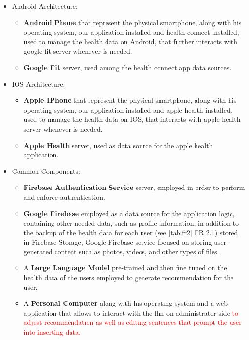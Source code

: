 \begin{itemize}[nosep] %
    \item Android Architecture:\vspace{2ex}
          \begin{itemize}[nosep]
              \item \textbf{Android Phone} that represent the physical smartphone, along with his operating system, our application installed and health connect installed, used to manage the health data on Android, that further interacts with google fit server whenever is needed.
              \item \textbf{Google Fit} server, used among the health connect app data sources.
          \end{itemize}
          \vspace{3ex}
    \item IOS Architecture:\vspace{2ex}
          \begin{itemize}[nosep]
              \item \textbf{Apple IPhone} that represent the physical smartphone, along with his operating system, our application installed and apple health installed, used to manage the health data on IOS, that interacts with apple health server whenever is needed.
              \item \textbf{Apple Health} server, used as data source for the apple health application.
          \end{itemize}
          \vspace{10ex}
    \item Common Components:\vspace{2ex}
          \begin{itemize}[nosep]
              \item \textbf{Firebase Authentication Service} server, employed in order to perform and enforce authentication.
              \item \textbf{Google Firebase} employed as a data source for the application logic, containing other needed data, such as profile information, in addition to the backup of the health data for each user (see \cref{tab:fr2} FR 2.1) stored in Firebase Storage, Google Firebase service focused on storing user-generated content such as photos, videos, and other types of files.
              \item A \textbf{Large Language Model} pre-trained and then fine tuned on the health data of the users employed to generate recommendation for the user. 
              \item A \textbf{Personal Computer} along with his operating system and a web application that allows to interact with the llm on administrator side \textcolor{red}{to adjust recommendation as well as editing sentences that prompt the user into inserting data.}  
          \end{itemize}
\end{itemize}
\vspace{3ex}

